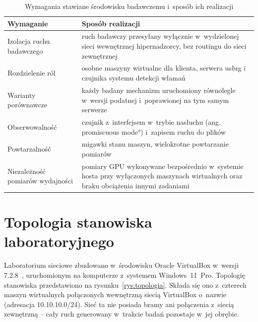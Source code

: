 \begin{table}[htbp]
\centering\small
\begin{tabularx}{\textwidth}{@{}>{\raggedright\arraybackslash}p{4.2cm}L@{}}
\toprule
\textbf{Wymaganie} & \textbf{Sposób realizacji} \\
\midrule
Izolacja ruchu badawczego & ruch badawczy przesyłany wyłącznie w~wydzielonej sieci wewnętrznej hipernadzorcy, bez routingu do sieci zewnętrznej \\
Rozdzielenie ról & osobne maszyny wirtualne dla klienta, serwera usług i czujnika systemu detekcji włamań \\
Warianty porównawcze & każdy badany mechanizm uruchomiony równolegle w~wersji podatnej i~poprawionej na tym samym serwerze \\
Obserwowalność & czujnik z~interfejsem w~trybie nasłuchu (ang. \ang{promiscuous mode}) i~zapisem ruchu do plików  \\
Powtarzalność & migawki stanu maszyn, wielokrotne powtarzanie pomiarów \\
Niezależność pomiarów wydajności & pomiary GPU wykonywane bezpośrednio w~systemie hosta przy wyłączonych maszynach wirtualnych oraz braku obciążenia innymi zadaniami \\

\bottomrule
\end{tabularx}
\caption{Wymagania stawiane środowisku badawczemu i~sposób ich realizacji}
\label{tab:wymagania}
\end{table}

\section{Topologia stanowiska laboratoryjnego}\label{sec:topologia}

Laboratorium sieciowe zbudowano w~środowisku Oracle VirtualBox w~wersji 7.2.8~\cite{virtualbox}, uruchomionym na komputerze z~systemem Windows~11~Pro. Topologię stanowiska przedstawiono na rysunku~\ref{rys:topologia}. Składa się ono z~czterech maszyn wirtualnych połączonych wewnętrzną siecią VirtualBox o~nazwie  (adresacja 10.10.10.0/24). Sieć ta nie posiada bramy ani połączenia z~siecią zewnętrzną -- cały ruch generowany w~trakcie badań pozostaje w~jej obrębie.

